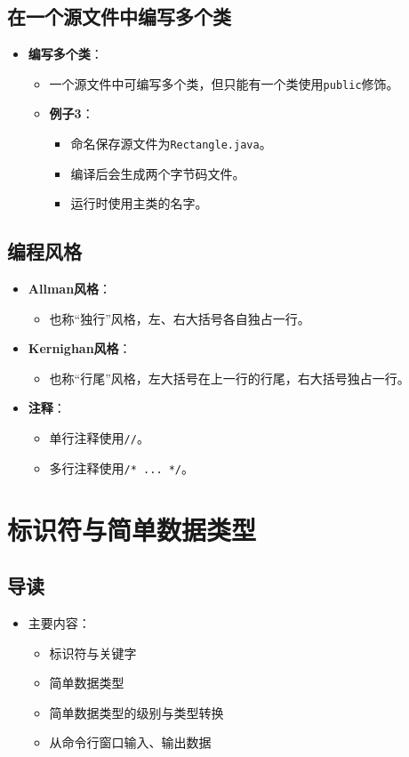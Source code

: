 \documentclass[a4paper, 10pt]{ctexart}
\begin{document}
\subsection{在一个源文件中编写多个类}
\begin{itemize}
  \item \textbf{编写多个类}：
  \begin{itemize}
    \item 一个源文件中可编写多个类，但只能有一个类使用\texttt{public}修饰。
    \item \textbf{例子3}：
    \begin{itemize}
      \item 命名保存源文件为\texttt{Rectangle.java}。
      \item 编译后会生成两个字节码文件。
      \item 运行时使用主类的名字。
    \end{itemize}
  \end{itemize}
\end{itemize}

\subsection{编程风格}
\begin{itemize}
  \item \textbf{Allman风格}：
  \begin{itemize}
    \item 也称“独行”风格，左、右大括号各自独占一行。
  \end{itemize}
  \item \textbf{Kernighan风格}：
  \begin{itemize}
    \item 也称“行尾”风格，左大括号在上一行的行尾，右大括号独占一行。
  \end{itemize}
  \item \textbf{注释}：
  \begin{itemize}
    \item 单行注释使用\texttt{//}。
    \item 多行注释使用\texttt{/* ... */}。
  \end{itemize}
\end{itemize}

\section{标识符与简单数据类型}

\subsection{导读}
\begin{itemize}
  \item 主要内容：
  \begin{itemize}
    \item 标识符与关键字
    \item 简单数据类型
    \item 简单数据类型的级别与类型转换
    \item 从命令行窗口输入、输出数据
  \end{itemize}
\end{itemize}
\end{document}
